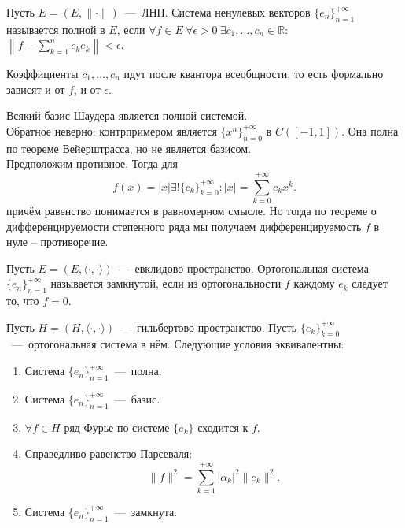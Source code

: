 \begin{definition}
    Пусть $E = (E,  \|\cdot\|)$~---~ЛНП. Система ненулевых векторов $\{e_n\}_{n = 1}^{+\infty}$ называется полной в $E$, если $\forall f \in E \ \forall \epsilon > 0 \  \exists c_1, \ldots, c_n \in \mathbb{R}$: $\left\|f - \sum\limits_{k = 1}^n c_k e_k \right\| < \epsilon$.
\end{definition}
\begin{remark}
    Коэффициенты $c_1, \ldots, c_n$ идут после квантора всеобщности, то есть формально зависят и от $f$, и от $\epsilon$.
\end{remark}
\begin{note}
    Всякий базис Шаудера является полной системой.\\
    Обратное неверно: контрпримером является $\{x^n\}_{n = 0}^{+\infty}$ в $C([-1, 1])$. Она полна по теореме Вейерштрасса, но не является базисом.\\
    Предположим противное.
    Тогда для
    \[
        f(x) = |x| \exists ! \{c_k\}_{k = 0}^{+\infty}: |x| = \sum\limits_{k = 0}^{+\infty} c_k x^k.
    \]
    причём равенство понимается в равномерном смысле.
    Но тогда по теореме о дифференцируемости степенного ряда мы получаем дифференцируемость $f$ в нуле -- противоречие.
\end{note}
\begin{definition}
    Пусть $E = (E, \langle \cdot, \cdot \rangle)$~---~евклидово пространство.
    Ортогональная система $\{e_n\}_{n = 1}^{+\infty}$ называется замкнутой, если из ортогональности $f$ каждому $e_k$ следует то, что $f = 0$.
\end{definition}
\begin{theorem}
    Пусть $H = (H, \langle \cdot, \cdot \rangle)$~---~гильбертово пространство.
    Пусть $\{e_k\}_{k = 0}^{+\infty}$~---~ортогональная система в нём.
    Следующие условия эквивалентны:
    \begin{enumerate}
        \item Система $\{e_n\}_{n = 1}^{+\infty}$~---~полна.
        \item Система $\{e_n\}_{n = 1}^{+\infty}$~---~базис.
        \item $\forall f \in H$ ряд Фурье по системе $\{e_k\}$ сходится к $f$.
        \item Справедливо равенство Парсеваля:
        \[
            \|f\|^2 = \sum\limits_{k = 1}^{+\infty} |\alpha_k|^2 \|e_k\|^2.
        \]
        \item Система $\{e_n\}_{n = 1}^{+\infty}$~---~замкнута.
    \end{enumerate}
\end{theorem}
